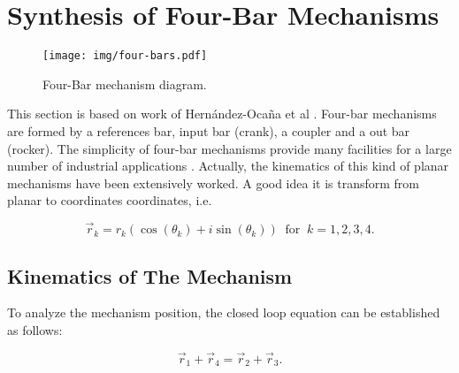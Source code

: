 \documentclass[12pt,letterpape]{article}
\begin{document}
\section{Synthesis of Four-Bar Mechanisms} %
\label{sec:synthesis_of_four_bar_mechanisms}

\begin{figure}[!ht]
	\centering
	\texttt{[image: img/four-bars.pdf]}
	\caption{Four-Bar mechanism diagram.}
	\label{fig:fourbar}
\end{figure}

This section is based on work of Hern{\'a}ndez-Oca{\~n}a et al \cite{hernandez2016}.
Four-bar mechanisms are formed by a references bar, input bar (crank), a coupler
and a out bar (rocker). The simplicity of four-bar mechanisms provide many facilities
for a large number of industrial applications \cite{david2005, mccarthy6, toussaint3}.
Actually, the kinematics of this kind of planar mechanisms have been extensively
worked. A good idea it is transform from planar to coordinates coordinates, i.e.

\begin{equation}
	\vec{r}_k = r_k ( \cos(\theta_k) + i \sin( \theta_k ) ) \ \text{ for } \ k = 1,2,3,4.
	\label{eqn:rpolar}
\end{equation}

\subsection{Kinematics of The Mechanism} %
\label{sub:kinematics_of_the_mechanism}

To analyze the mechanism position, the closed loop equation can be established as follows:

\begin{equation}
	\vec{r}_1 + \vec{r}_4 = \vec{r}_2 + \vec{r}_3.
	\label{eqn:sumsr}
\end{equation}
\end{document}

